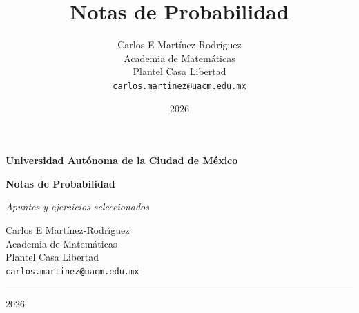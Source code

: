 \documentclass[12pt,twoside]{article}
\title{Notas de Probabilidad}
\author{Carlos E Mart\'inez-Rodr\'iguez\\
  \small Academia de Matem\'aticas\\
  \small Plantel Casa Libertad\\
  \texttt{carlos.martinez@uacm.edu.mx}
}
\date{2026}
\begin{document}
\begin{titlepage}
  \thispagestyle{empty} %
  \begin{center}
    \vspace*{2.5cm}

    {\Large \textbf{Universidad Aut\'onoma de la Ciudad de M\'exico}\par}
    \vspace{2.5cm}

    {\huge \textbf{Notas de Probabilidad}\par}
    \vspace{0.8cm}
    {\Large \textit{Apuntes y ejercicios seleccionados}\par}

    \vspace{3.5cm}
    {\large
      Carlos E Mart\'inez-Rodr\'iguez\\
      Academia de Matem\'aticas\\
      Plantel Casa Libertad\\
      \texttt{carlos.martinez@uacm.edu.mx}
    \par}

    \vspace{4cm}
    \rule{0.6\textwidth}{0.6pt}\par
    \vspace{0.5cm}
    {\large 2026}\par
  \end{center}
\end{titlepage}
\thispagestyle{empty}
\tableofcontents
\clearpage
\thispagestyle{empty}
\null
\newpage
\setcounter{page}{1}
\newpage






\newpage

\newpage


%

%

%
\end{document}

